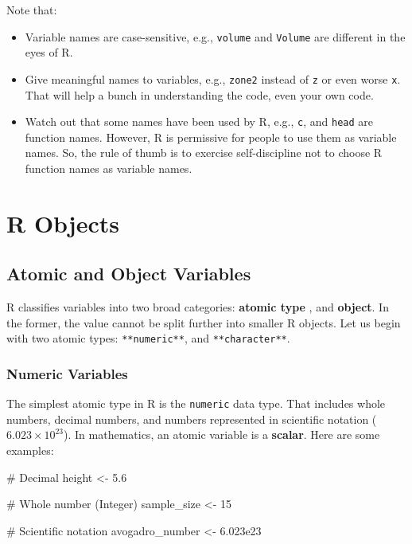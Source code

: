 \documentclass[
  letterpaper,
]{book}
\newenvironment{Shaded}{\begin{snugshade}}{\end{snugshade}}
\newcommand{\CommentTok}[1]{\textcolor[rgb]{0.37,0.37,0.37}{#1}}
\newcommand{\DecValTok}[1]{\textcolor[rgb]{0.68,0.00,0.00}{#1}}
\newcommand{\FloatTok}[1]{\textcolor[rgb]{0.68,0.00,0.00}{#1}}
\newcommand{\NormalTok}[1]{\textcolor[rgb]{0.00,0.23,0.31}{#1}}
\newcommand{\OtherTok}[1]{\textcolor[rgb]{0.00,0.23,0.31}{#1}}
\begin{document}
Note that:

\begin{itemize}
\item
  Variable names are case-sensitive, e.g., \texttt{volume} and
  \texttt{Volume} are different in the eyes of R.
\item
  Give meaningful names to variables, e.g., \texttt{zone2} instead of
  \texttt{z} or even worse \texttt{x}. That will help a bunch in
  understanding the code, even your own code.
\item
  Watch out that some names have been used by R, e.g., \texttt{c}, and
  \texttt{head} are function names. However, R is permissive for people
  to use them as variable names. So, the rule of thumb is to exercise
  self-discipline not to choose R function names as variable names.
\end{itemize}

\section*{R Objects}\label{r-objects}


\subsection*{Atomic and Object
Variables}\label{atomic-and-object-variables}

R classifies variables into two broad categories: \textbf{atomic type} ,
and \textbf{object}. In the former, the value cannot be split further
into smaller R objects. Let us begin with two atomic types:
\texttt{**numeric**}, and \texttt{**character**}.

\subsubsection*{Numeric Variables}\label{numeric-variables}

The simplest atomic type in R is the \texttt{numeric} data type. That
includes whole numbers, decimal numbers, and numbers represented in
scientific notation (\(6.023\times10^{23}\)). In mathematics, an atomic
variable is a \textbf{scalar}. Here are some examples:

\begin{Shaded}
\begin{Highlighting}[]
\CommentTok{\# Decimal}
\NormalTok{height }\OtherTok{\textless{}{-}} \FloatTok{5.6}

\CommentTok{\# Whole number (Integer)}
\NormalTok{sample\_size }\OtherTok{\textless{}{-}} \DecValTok{15}

\CommentTok{\# Scientific notation}
\NormalTok{avogadro\_number }\OtherTok{\textless{}{-}} \FloatTok{6.023e23}
\end{Highlighting}
\end{Shaded}
\end{document}
